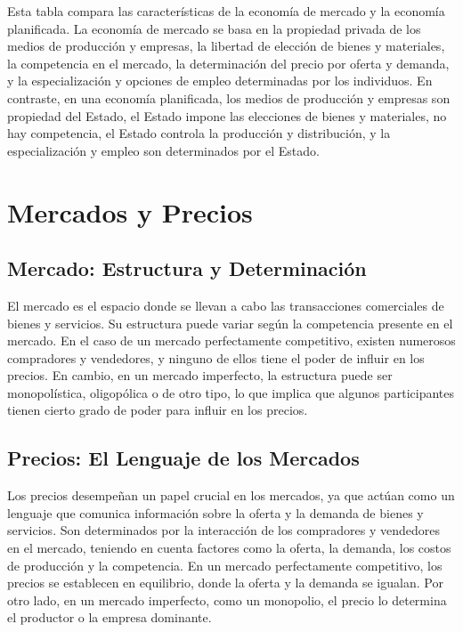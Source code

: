 \documentclass[
  doc,
  floatsintext,
  longtable,
  a4paper,
  nolmodern,
  notxfonts,
  notimes,
  12pt,
  colorlinks=true,linkcolor=blue,citecolor=blue,urlcolor=blue]{apa7}
\begin{document}
Esta tabla compara las características de la economía de mercado y la
economía planificada. La economía de mercado se basa en la propiedad
privada de los medios de producción y empresas, la libertad de elección
de bienes y materiales, la competencia en el mercado, la determinación
del precio por oferta y demanda, y la especialización y opciones de
empleo determinadas por los individuos. En contraste, en una economía
planificada, los medios de producción y empresas son propiedad del
Estado, el Estado impone las elecciones de bienes y materiales, no hay
competencia, el Estado controla la producción y distribución, y la
especialización y empleo son determinados por el Estado.

\section{Mercados y Precios}\label{mercados-y-precios}

\subsection{Mercado: Estructura y
Determinación}\label{mercado-estructura-y-determinaciuxf3n}

El mercado es el espacio donde se llevan a cabo las transacciones
comerciales de bienes y servicios. Su estructura puede variar según la
competencia presente en el mercado. En el caso de un mercado
perfectamente competitivo, existen numerosos compradores y vendedores, y
ninguno de ellos tiene el poder de influir en los precios. En cambio, en
un mercado imperfecto, la estructura puede ser monopolística,
oligopólica o de otro tipo, lo que implica que algunos participantes
tienen cierto grado de poder para influir en los precios.

\subsection{Precios: El Lenguaje de los
Mercados}\label{precios-el-lenguaje-de-los-mercados}

Los precios desempeñan un papel crucial en los mercados, ya que actúan
como un lenguaje que comunica información sobre la oferta y la demanda
de bienes y servicios. Son determinados por la interacción de los
compradores y vendedores en el mercado, teniendo en cuenta factores como
la oferta, la demanda, los costos de producción y la competencia. En un
mercado perfectamente competitivo, los precios se establecen en
equilibrio, donde la oferta y la demanda se igualan. Por otro lado, en
un mercado imperfecto, como un monopolio, el precio lo determina el
productor o la empresa dominante.
\end{document}
